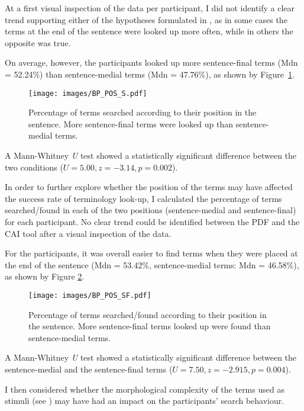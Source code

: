 At a first visual inspection of the data per participant, I did not identify a clear trend supporting either of the hypotheses formulated in , as in some cases the terms at the end of the sentence were looked up more often, while in others the opposite was true.

On average, however, the participants looked up more sentence-final terms (Mdn = 52.24\%) than sentence-medial terms (Mdn = 47.76\%), as shown by Figure~\ref{fig:BP_POS_S}.\largerpage

\begin{figure}
\texttt{[image: images/BP\_POS\_S.pdf]}
\caption[Percentage of terms searched by position]{Percentage of terms searched according to their position in the sentence. More sentence-final terms were looked up than sentence-medial terms.}
\label{fig:BP_POS_S}
\end{figure}

A Mann-Whitney \textit{U} test showed a statistically significant difference between the two conditions ($U = 5.00, z = -3.14, p = 0.002$).

 \label{terms_found_position}
In order to further explore whether the position of the terms may have affected the success rate of terminology look-up, I calculated the percentage of terms searched/found in each of the two positions (sentence-medial and sentence-final) for each participant. No clear trend could be identified between the PDF and the CAI tool after a visual inspection of the data.

For the participants, it was overall easier to find terms when they were placed at the end of the sentence (Mdn = 53.42\%, sentence-medial terms: Mdn = 46.58\%), as shown by Figure \ref{fig:BP_POS_SF}.

\begin{figure}
\texttt{[image: images/BP\_POS\_SF.pdf]}
\caption[Percentage of terms searched/found by position]{Percentage of terms searched/found according to their position in the sentence. More sentence-final terms looked up were found than sentence-medial terms.}
\label{fig:BP_POS_SF}
\end{figure}

A Mann-Whitney \textit{U} test showed a statistically significant difference between the sentence-medial and the sentence-final terms ($U = 7.50, z = -2.915, p = 0.004$).

 \label{terms_searched_structure}
I then considered whether the morphological complexity of the terms used as stimuli (see ) may have had an impact on the participants' search behaviour.

